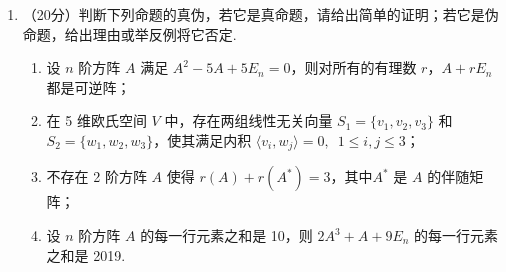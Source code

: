\begin{enumerate}
    \item （20分）判断下列命题的真伪，若它是真命题，请给出简单的证明；若它是伪命题，给出理由或举反例将它否定.
    \begin{enumerate}
        \item 设 $n$ 阶方阵 $A$ 满足 $A^2-5A+5E_n=0$，则对所有的有理数 $r$，$A+rE_n$ 都是可逆阵；

        \item 在 5 维欧氏空间 $V$ 中，存在两组线性无关向量 $S_1=\{v_1,v_2,v_3\}$ 和 $S_2=\{w_1,w_2,w_3\}$，使其满足内积 $\langle v_i,w_j\rangle=0,\enspace 1 \leqslant i,j \leqslant 3$；

        \item 不存在 2 阶方阵 $A$ 使得 $r(A)+r(A^*)=3$，其中$A^*$ 是 $A$ 的伴随矩阵；

        \item 设 $n$ 阶方阵 $A$ 的每一行元素之和是 10，则 $2A^3+A+9E_n$ 的每一行元素之和是 2019.
    \end{enumerate}
\end{enumerate}

\clearpage

